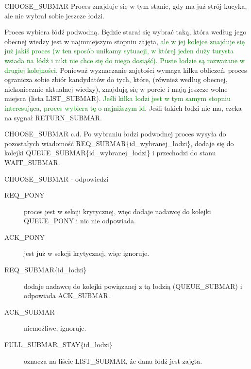 \documentclass{beamer}
\begin{document}
\begin{frame}{CHOOSE\_SUBMAR}
    \internallinenumbers
    \resetlinenumber[1]
    Proces znajduje się w tym stanie, gdy ma już strój kucyka, ale nie wybrał sobie jeszcze łodzi.

    \vspace{0.4cm}
    Proces wybiera łódź podwodną. Będzie starał się wybrać taką, która według jego obecnej wiedzy jest w najmniejszym stopniu zajęta, \textcolor{green}{ale w jej kolejce znajduje się już jakiś proces (w ten sposób unikamy sytuacji, w której jeden duży turysta wsiada na łódź i nikt nie chce się do niego dosiąść). Puste łodzie są rozważane w drugiej kolejności.} Ponieważ wyznaczanie zajętości wymaga kilku obliczeń, proces ogranicza sobie zbiór kandydatów do tych, które, (również według obecnej, niekoniecznie aktualnej wiedzy), znajdują się w porcie i mają jeszcze wolne miejsca (lista LIST\_SUBMAR). \textcolor{green}{Jeśli kilka łodzi jest w tym samym stopniu interesująca, proces wybiera tę o najniższym id.} Jeśli takich łodzi nie ma, czeka na sygnał RETURN\_SUBMAR.
\end{frame}

\begin{frame}{CHOOSE\_SUBMAR c.d.}
    \internallinenumbers
    \resetlinenumber[1]
    Po wybraniu łodzi podwodnej proces wysyła do pozostałych wiadomość REQ\_SUBMAR\{id\_wybranej\_łodzi\}, dodaje się do kolejki QUEUE\_SUBMAR\{id\_wybranej\_łodzi\} i przechodzi do stanu WAIT\_SUBMAR.
\end{frame}

\begin{frame}{CHOOSE\_SUBMAR - odpowiedzi}
    \internallinenumbers
    \resetlinenumber[1]
    \begin{description}
        \item [REQ\_PONY] proces jest w sekcji krytycznej, więc dodaje nadawcę do kolejki QUEUE\_PONY i nic nie odpowiada. 
        \item [ACK\_PONY] jest już w sekcji krytycznej, więc ignoruje.
        \item [REQ\_SUBMAR\{id\_łodzi\}] dodaje nadawcę do kolejki powiązanej z tą łodzią (QUEUE\_SUBMAR) i odpowiada ACK\_SUBMAR.
        \item [ACK\_SUBMAR] niemożliwe, ignoruje.
        \item [FULL\_SUBMAR\_STAY\{id\_łodzi\}] oznacza na liście LIST\_SUBMAR, że dana łódź jest zajęta.

    \end{description}
\end{frame}
\end{document}
